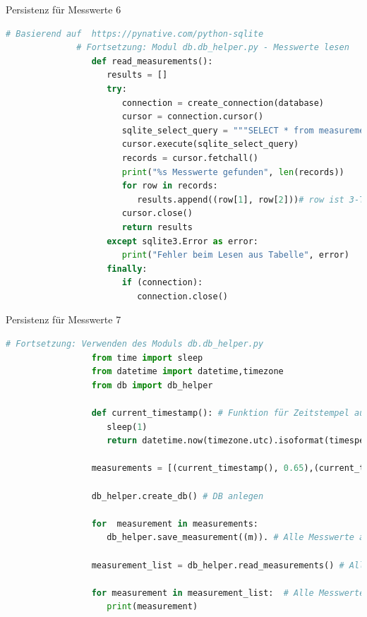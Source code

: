 \begin{frame}[fragile]{Persistenz für Messwerte 6}
       \begin{lstlisting}[language=Python, gobble=8]
              # Basierend auf  https://pynative.com/python-sqlite
              # Fortsetzung: Modul db.db_helper.py - Messwerte lesen
                 def read_measurements():
                    results = []
                    try:
                       connection = create_connection(database)
                       cursor = connection.cursor()
                       sqlite_select_query = """SELECT * from measurements"""
                       cursor.execute(sqlite_select_query)
                       records = cursor.fetchall()
                       print("%s Messwerte gefunden", len(records))
                       for row in records:
                          results.append((row[1], row[2]))# row ist 3-Tupel (ID, Zeitstempel, Messwert)
                       cursor.close()
                       return results
                    except sqlite3.Error as error:
                       print("Fehler beim Lesen aus Tabelle", error)
                    finally:
                       if (connection):
                          connection.close()
       \end{lstlisting}

\end{frame}

\begin{frame}[fragile]{Persistenz für Messwerte 7}
       \begin{lstlisting}[language=Python, gobble=8]
              # Fortsetzung: Verwenden des Moduls db.db_helper.py
                 from time import sleep
                 from datetime import datetime,timezone
                 from db import db_helper

                 def current_timestamp(): # Funktion für Zeitstempel aus CSV Beispiel
                    sleep(1)
                    return datetime.now(timezone.utc).isoformat(timespec='milliseconds')

                 measurements = [(current_timestamp(), 0.65),(current_timestamp(), 0.7),(current_timestamp(), 0.98) ] # Messungen als Tupel

                 db_helper.create_db() # DB anlegen

                 for  measurement in measurements:
                    db_helper.save_measurement((m)). # Alle Messwerte abspeichern

                 measurement_list = db_helper.read_measurements() # Alle Messwerte laden

                 for measurement in measurement_list:  # Alle Messwerte ausgeben
                    print(measurement)
       \end{lstlisting}

\end{frame}



